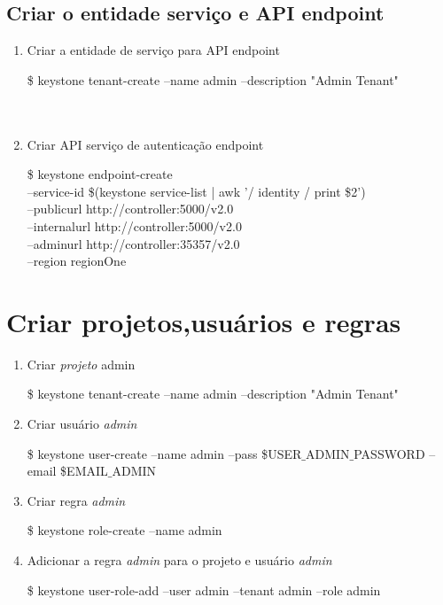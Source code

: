 \subsection{Criar o entidade serviço e API endpoint}
\begin{enumerate}
	\item Criar a entidade de serviço para API endpoint
	\begin{snugshade}
		\$ keystone tenant-create --name admin --description "Admin Tenant" \\ \\ \\
	\end{snugshade}
	
	\item Criar API serviço de autenticação endpoint
	\begin{snugshade}
		\$ keystone endpoint-create \ \\
		--service-id \$(keystone service-list | awk '/ identity / {print \$2}') \ \\
		--publicurl http://controller:5000/v2.0 \ \\
		--internalurl http://controller:5000/v2.0 \ \\
		--adminurl http://controller:35357/v2.0 \ \\
		--region regionOne
	\end{snugshade}	
\end{enumerate}

\section{Criar projetos,usuários e regras}
\begin{enumerate}
	\item Criar \emph{projeto} admin
	\begin{snugshade}
		\$	keystone tenant-create --name admin --description "Admin Tenant"
	\end{snugshade}	
	
	\item Criar usuário \emph{admin}
	\begin{snugshade}
		\$	keystone user-create --name admin --pass \$USER$\_$ADMIN$\_$PASSWORD --email \$EMAIL$\_$ADMIN
	\end{snugshade}		
	
	\item Criar regra \emph{admin}
	\begin{snugshade}
		\$	keystone role-create --name admin
	\end{snugshade}		
	
	\item Adicionar a regra \emph{admin} para o projeto e usuário \emph{admin}
	\begin{snugshade}
		\$	keystone user-role-add --user admin --tenant admin --role admin
	\end{snugshade}			
	
\end{enumerate}

